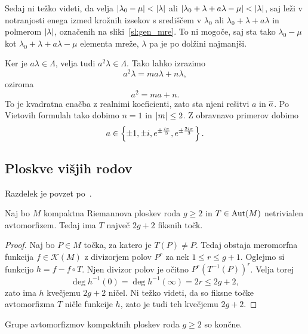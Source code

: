

Sedaj ni težko videti, da velja
$\left\lvert \lambda_0 - \mu\right\rvert < \left\lvert \lambda\right\rvert$ ali
$\left\lvert \lambda_0 + \lambda + a \lambda - \mu\right\rvert < \left\lvert \lambda\right\rvert$, saj
leži v notranjosti enega izmed krožnih izsekov s središčem v
$\lambda_0$ ali $\lambda_0 + \lambda + a \lambda$ in polmerom
$\left\lvert \lambda\right\rvert$, označenih na sliki~\ref{sl:gen_mre}. To ni mogoče,
saj sta tako $\lambda_0 - \mu$ kot
$\lambda_0 + \lambda + a \lambda - \mu$ elementa mreže, $\lambda$
pa je po dolžini najmanjši.

Ker je $a \lambda \in \Lambda$, velja tudi
$a^2 \lambda \in \Lambda$. Tako lahko izrazimo
\[
a^2 \lambda = m a \lambda + n \lambda,
\]
oziroma
\[
a^2 = ma + n.
\]
To je kvadratna enačba z realnimi koeficienti, zato sta njeni
rešitvi $a$ in $\overline{a}$. Po Vietovih formulah tako dobimo $n=1$
in $\left\lvert m\right\rvert \leq 2$. Z obravnavo primerov dobimo
\[
a \in \left\{\pm 1, \pm i,
e^{\pm \frac{i \pi}{3}}, e^{\pm \frac{2i \pi}{3}}\right\}.
\]

\subsection{Ploskve višjih rodov}

Razdelek je povzet po~\cite[poglavje V.1]{Farkas_Kra_1980}.

\begin{trditev}
\label{td:fix_num}
Naj bo $M$ kompaktna Riemannova ploskev roda $g \geq 2$ in
$T \in \operatorname{Aut}(M)$ netrivialen avtomorfizem. Tedaj ima $T$ največ
$2g + 2$ fiksnih točk.
\end{trditev}

\begin{proof}
Naj bo $P \in M$ točka, za katero je $T(P) \ne P$. Tedaj obstaja
meromorfna funkcija $f \in \mathscr{K}(M)$ z divizorjem polov
$P^r$ za nek $1 \leq r \leq g + 1$. Oglejmo si funkcijo
$h = f - f \circ T$. Njen divizor polov je očitno
$P^r (T^{-1}(P))^r$. Velja torej
\[
\deg h^{-1}(0) = \deg h^{-1}(\infty) = 2r \leq 2g + 2,
\]
zato ima $h$ kvečjemu $2g + 2$ ničel. Ni težko videti, da so fiksne
točke avtomorfizma $T$ ničle funkcije $h$, zato je tudi teh
kvečjemu $2g + 2$.
\end{proof}

\begin{izrek}[Schwarz]
Grupe avtomorfizmov kompaktnih ploskev roda $g \geq 2$ so končne.
\end{izrek}

